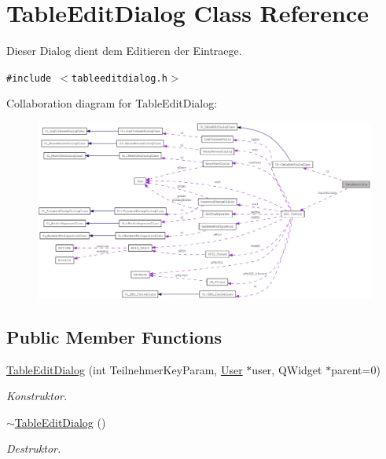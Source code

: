 \hypertarget{class_table_edit_dialog}{
\section{TableEditDialog Class Reference}
\label{class_table_edit_dialog}
}
Dieser Dialog dient dem Editieren der Eintraege.  


{\tt \#include $<$tableeditdialog.h$>$}

Collaboration diagram for TableEditDialog:\nopagebreak
\begin{figure}[H]
\begin{center}
\leavevmode
\includegraphics[width=400pt]{class_table_edit_dialog__coll__graph}
\end{center}
\end{figure}
\subsection*{Public Member Functions}
\begin{CompactItemize}
\item 
\hyperlink{class_table_edit_dialog_f1bf42b072c27aeb0eb3f29d497a0a8f}{TableEditDialog} (int TeilnehmerKeyParam, \hyperlink{class_user}{User} $\ast$user, QWidget $\ast$parent=0)
\begin{CompactList}\small\item\em Konstruktor. \item\end{CompactList}\item 
\hyperlink{class_table_edit_dialog_cb768ab9eaca499eee124debc9762067}{$\sim$TableEditDialog} ()
\begin{CompactList}\small\item\em Destruktor. \item\end{CompactList}\end{CompactItemize}
